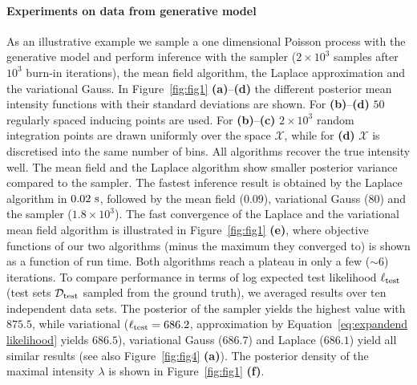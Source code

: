 \documentclass[twoside,11pt]{article}
\newcommand{\dataset}{{\cal D}}
\newcommand{\X}{\mathcal{X}}
\begin{document}
\paragraph{Experiments on data from generative model} As an illustrative example we sample a one dimensional Poisson process with the generative model and perform inference with the sampler ($2\times10^3$ samples after $10^3$ burn-in iterations), the mean field algorithm, the Laplace approximation and the variational Gauss. In Figure~\ref{fig:fig1} {\bf (a)}--{\bf (d)} the different posterior mean intensity functions with their standard deviations are shown. For {\bf (b)}--{\bf (d)} $50$ regularly spaced inducing points are used. For {\bf (b)}--{\bf (c)} $2\times 10^3$ random integration points are drawn uniformly over the space $\X$, while for {\bf (d)} $\X$ is discretised into the same number of bins. All algorithms recover the true intensity well. The mean field and the Laplace algorithm show smaller posterior variance compared to the sampler. The fastest inference result is obtained by the Laplace algorithm in $0.02\ \rm{s}$, followed by the mean field ($0.09$), variational Gauss ($80$) and the sampler ($1.8\times10^3$). The fast convergence of the Laplace and the variational mean field algorithm is illustrated in Figure~\ref{fig:fig1} {\bf (e)}, where objective functions of our two algorithms (minus the maximum they converged to) is shown as a function of run time. Both algorithms reach a plateau in only a few ($\sim 6$) iterations. To compare performance in terms of log expected test likelihood $\ell_{\rm test}$ (test sets $\dataset_{\rm test}$ sampled from the ground truth), we averaged results over ten independent data sets. The posterior of the sampler yields the highest value with $875.5$, while variational ($\ell_{\rm test}=686.2$, approximation by Equation~\eqref{eq:expandend likelihood} yields $686.5$), variational Gauss ($686.7$) and Laplace ($686.1$) yield all similar results (see also Figure~\ref{fig:fig4} {\bf (a)}). The posterior density of the maximal intensity $\lambda$ is shown in Figure~\ref{fig:fig1} {\bf (f)}.
\end{document}
